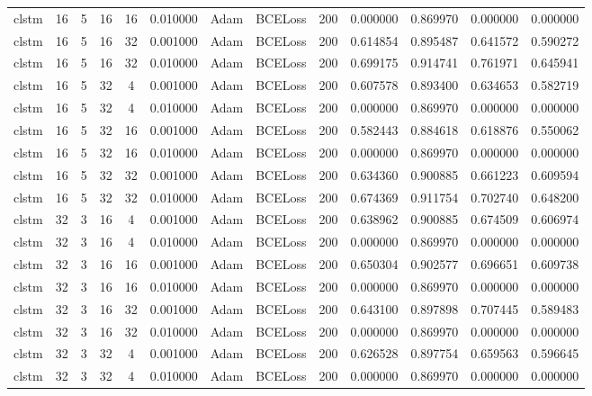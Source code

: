 \documentclass[10pt,twocolumn,letterpaper]{article}
\begin{document}
\begin{appendices}
{\begin{center}
\begin{tabular}{ |c|c|c|c|c|c|c|c|c|c|c|c|c| }
         clstm & 16 & 5 & 16 & 16 & 0.010000 & Adam & BCELoss & 200 & 0.000000 & 0.869970 & 0.000000 & 0.000000 \\
         clstm & 16 & 5 & 16 & 32 & 0.001000 & Adam & BCELoss & 200 & 0.614854 & 0.895487 & 0.641572 & 0.590272 \\
         clstm & 16 & 5 & 16 & 32 & 0.010000 & Adam & BCELoss & 200 & 0.699175 & 0.914741 & 0.761971 & 0.645941 \\
         clstm & 16 & 5 & 32 & 4 & 0.001000 & Adam & BCELoss & 200 & 0.607578 & 0.893400 & 0.634653 & 0.582719 \\
         clstm & 16 & 5 & 32 & 4 & 0.010000 & Adam & BCELoss & 200 & 0.000000 & 0.869970 & 0.000000 & 0.000000 \\
         clstm & 16 & 5 & 32 & 16 & 0.001000 & Adam & BCELoss & 200 & 0.582443 & 0.884618 & 0.618876 & 0.550062 \\
         clstm & 16 & 5 & 32 & 16 & 0.010000 & Adam & BCELoss & 200 & 0.000000 & 0.869970 & 0.000000 & 0.000000 \\
         clstm & 16 & 5 & 32 & 32 & 0.001000 & Adam & BCELoss & 200 & 0.634360 & 0.900885 & 0.661223 & 0.609594 \\
         clstm & 16 & 5 & 32 & 32 & 0.010000 & Adam & BCELoss & 200 & 0.674369 & 0.911754 & 0.702740 & 0.648200 \\
         clstm & 32 & 3 & 16 & 4 & 0.001000 & Adam & BCELoss & 200 & 0.638962 & 0.900885 & 0.674509 & 0.606974 \\
         clstm & 32 & 3 & 16 & 4 & 0.010000 & Adam & BCELoss & 200 & 0.000000 & 0.869970 & 0.000000 & 0.000000 \\
         clstm & 32 & 3 & 16 & 16 & 0.001000 & Adam & BCELoss & 200 & 0.650304 & 0.902577 & 0.696651 & 0.609738 \\
         clstm & 32 & 3 & 16 & 16 & 0.010000 & Adam & BCELoss & 200 & 0.000000 & 0.869970 & 0.000000 & 0.000000 \\
         clstm & 32 & 3 & 16 & 32 & 0.001000 & Adam & BCELoss & 200 & 0.643100 & 0.897898 & 0.707445 & 0.589483 \\
         clstm & 32 & 3 & 16 & 32 & 0.010000 & Adam & BCELoss & 200 & 0.000000 & 0.869970 & 0.000000 & 0.000000 \\
         clstm & 32 & 3 & 32 & 4 & 0.001000 & Adam & BCELoss & 200 & 0.626528 & 0.897754 & 0.659563 & 0.596645 \\
         clstm & 32 & 3 & 32 & 4 & 0.010000 & Adam & BCELoss & 200 & 0.000000 & 0.869970 & 0.000000 & 0.000000 \\

\end{tabular}
\end{center}}
\end{appendices}
\end{document}
